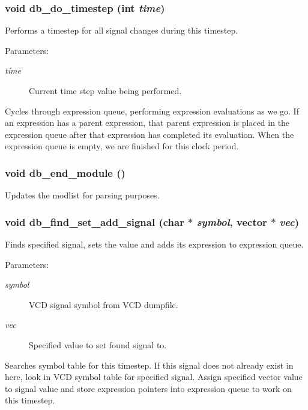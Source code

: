 \subsubsection{\setlength{\rightskip}{0pt plus 5cm}void db\_\-do\_\-timestep (int {\em time})}\label{db_8c_a32}


Performs a timestep for all signal changes during this timestep.

\begin{Desc}
\item[Parameters: ]\par
\begin{description}
\item[{\em 
time}]Current time step value being performed.\end{description}
\end{Desc}
Cycles through expression queue, performing expression evaluations as we go. If an expression has a parent expression, that parent expression is placed in the expression queue after that expression has completed its evaluation. When the expression queue is empty, we are finished for this clock period. 
\subsubsection{\setlength{\rightskip}{0pt plus 5cm}void db\_\-end\_\-module ()}\label{db_8c_a17}


Updates the modlist for parsing purposes. 
\subsubsection{\setlength{\rightskip}{0pt plus 5cm}void db\_\-find\_\-set\_\-add\_\-signal (char $\ast$ {\em symbol}, {\bf vector} $\ast$ {\em vec})}\label{db_8c_a31}


Finds specified signal, sets the value and adds its expression to expression queue.

\begin{Desc}
\item[Parameters: ]\par
\begin{description}
\item[{\em 
symbol}]VCD signal symbol from VCD dumpfile. \item[{\em 
vec}]Specified value to set found signal to.\end{description}
\end{Desc}
Searches symbol table for this timestep. If this signal does not already exist in here, look in VCD symbol table for specified signal. Assign specified vector value to signal value and store expression pointers into expression queue to work on this timestep. 

